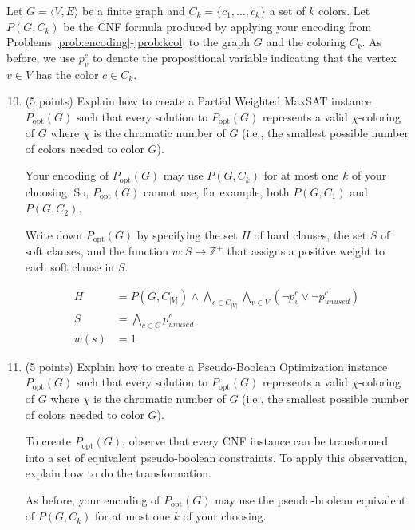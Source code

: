 \documentclass{article}
\newenvironment{solution}{\color{blue} \em }{}
\begin{document}
Let $G = \langle V, E\rangle$ be a finite graph and $C_k = \{ c_1, \ldots, c_k \}$ a set of $k$ colors.
Let $P(G, C_k)$ be the CNF formula produced by applying your encoding from Problems \ref{prob:encoding}-\ref{prob:kcol}
to the graph $G$ and the coloring $C_k$.
As before, we use $p_v^c$ to denote the propositional variable indicating that the vertex $v\in V$ has the color $c\in C_k$.


\begin{enumerate}
	\setcounter{enumi}{9}

	\item (5 points) Explain how to create a Partial Weighted MaxSAT instance $P_{\text{opt}}(G)$
	such that every solution to $P_{\text{opt}}(G)$ represents a valid $\chi$-coloring of $G$ where $\chi$ is
	the chromatic number of $G$ (i.e., the smallest possible number of colors needed to color $G$).

	Your encoding of  $P_{\text{opt}}(G)$ may use $P(G, C_k)$ for at most one $k$ of your choosing.
	So, $P_{\text{opt}}(G)$ cannot use, for example, both $P(G, C_1)$ and $P(G, C_2)$.

	Write down  $P_{\text{opt}}(G)$ by specifying the set $H$ of hard clauses,
	the set $S$ of soft clauses, and the function $w : S \rightarrow \mathbb{Z^+}$ that assigns a positive weight to each soft clause in $S$.

\begin{solution}
	\begin{align*}
        H    	&=    P(G, C_{|V|}) \land \bigwedge_{c \in C_{|V|}} \bigwedge_{v \in V} (\neg p_v^c \lor \neg p_{unused}^c)  \\
        S    	&=     \bigwedge_{c \in C} p^c_{unused} \\
        w(s)    &=    1
	\end{align*}
\end{solution}

	\item (5 points)  Explain how to create a Pseudo-Boolean Optimization instance $P_{\text{opt}}(G)$
	such that every solution to $P_{\text{opt}}(G)$ represents a valid $\chi$-coloring of $G$ where $\chi$ is
	the chromatic number of $G$ (i.e., the smallest possible number of colors needed to color $G$).

	To create $P_{\text{opt}}(G)$, observe that every CNF instance
	can be transformed into a set of equivalent pseudo-boolean constraints.
	To apply this observation, explain how to do the transformation.

	As before, your encoding of  $P_{\text{opt}}(G)$ may use the  pseudo-boolean equivalent of  $P(G, C_k)$ for at most one $k$ of your choosing.



\end{enumerate}
\end{document}
